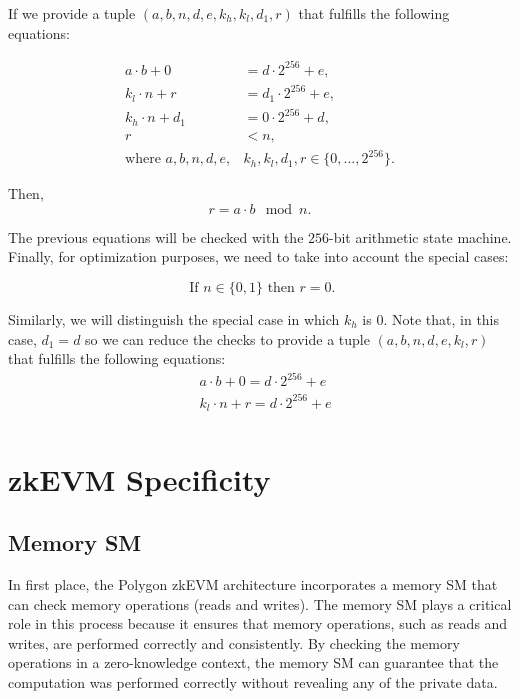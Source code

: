 If we provide a tuple $(a,b,n,d,e,k_h,k_l,d_1,r)$ that fulfills the following equations:

\begin{align*}
a \cdot b + 0 &= d \cdot 2^{256} + e,  \\
k_l \cdot n + r &= d_1 \cdot 2^{256} + e, \\
k_h \cdot n+d_1 &= 0 \cdot 2^{256} + d, \\
r &< n, \\
\text{where } a, b, n, d, e, &k_h, k_l, d_1, r \in  \{0, \dots, 2^{256} \}.
\end{align*}

Then, 
\[
r = a \cdot b \mod{n}.
\]

The previous equations will be checked with the $256$-bit arithmetic state machine. Finally, for optimization purposes, we need to take into account the special cases: 

\[
\text{ If } n \in \{0, 1\} \text{ then } r = 0.
\]

Similarly, we will distinguish the special case in which $k_h$ is 0. Note that, in this case, $d_1 = d$ so we can reduce the checks to provide a tuple $(a,b,n,d,e,k_l,r)$ that fulfills the following equations:
\begin{align*}
&a \cdot b + 0 = d \cdot 2^{256} + e \\
&k_l \cdot n+r = d \cdot 2^{256} + e \\
\end{align*}








\section{zkEVM Specificity}

\subsection{Memory SM}

In first place, the Polygon zkEVM architecture incorporates a memory SM that can check memory operations (reads and writes). The memory SM plays a critical role in this process because it ensures that memory operations, such as reads and writes, are performed correctly and consistently. By checking the memory operations in a zero-knowledge context, the memory SM can guarantee that the computation was performed correctly without revealing any of the private data.

